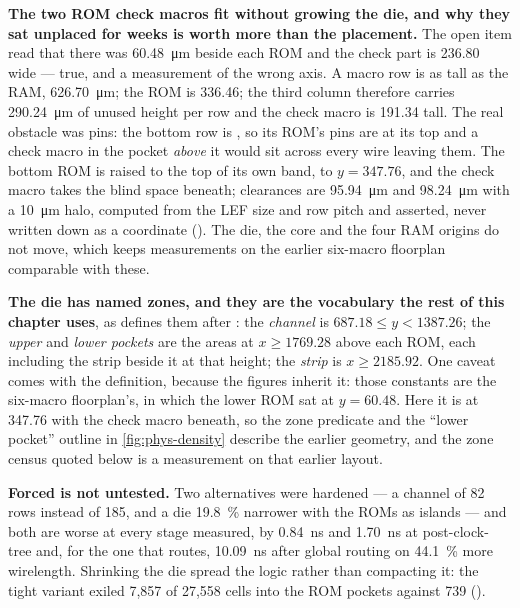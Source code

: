 \textbf{The two ROM check macros fit without growing the die, and why
they sat unplaced for weeks is worth more than the placement.} The open
item read that there was \qty{60.48}{\micro\metre} beside each ROM and
the check part is \num{236.80} wide --- true, and a measurement of the
wrong axis. A macro row is as tall as the RAM,
\qty{626.70}{\micro\metre}; the ROM is \num{336.46}; the third column
therefore carries \qty{290.24}{\micro\metre} of unused height per row
and the check macro is \num{191.34} tall. The real obstacle was pins:
the bottom row is , so its ROM's pins are at its top and a
check macro in the pocket \emph{above} it would sit across every wire
leaving them. The bottom ROM is raised to the top of its own band, to
$y=347.76$, and the check macro takes the blind space beneath;
clearances are \qty{95.94}{\micro\metre} and \qty{98.24}{\micro\metre}
with a \qty{10}{\micro\metre} halo, computed from the LEF size and row
pitch and asserted, never written down as a coordinate
(). The die, the core and the four RAM origins do
not move, which keeps measurements on the earlier six-macro floorplan
comparable with these.

\textbf{The die has named zones, and they are the vocabulary the rest of
this chapter uses}, as 
defines them after : the \emph{channel} is
$687.18 \le y < 1387.26$; the \emph{upper} and \emph{lower pockets} are
the areas at $x \ge 1769.28$ above each ROM, each including the strip
beside it at that height; the \emph{strip} is $x \ge 2185.92$. One
caveat comes with the definition, because the figures inherit it: those
constants are the six-macro floorplan's, in which the lower ROM sat at
$y=60.48$. Here it is at \num{347.76} with the check macro beneath, so
the zone predicate and the ``lower pocket'' outline in
\cref{fig:phys-density} describe the earlier geometry, and the zone
census quoted below is a measurement on that earlier layout.

\textbf{Forced is not untested.} Two alternatives were hardened --- a
channel of 82 rows instead of 185, and a die \qty{19.8}{\percent}
narrower with the ROMs as islands --- and both are worse at every stage
measured, by \qty{0.84}{\nano\second} and \qty{1.70}{\nano\second} at
post-clock-tree and, for the one that routes, \qty{10.09}{\nano\second}
after global routing on \qty{44.1}{\percent} more wirelength. Shrinking
the die spread the logic rather than compacting it: the tight variant
exiled 7,857 of 27,558 cells into the ROM pockets against 739
().

